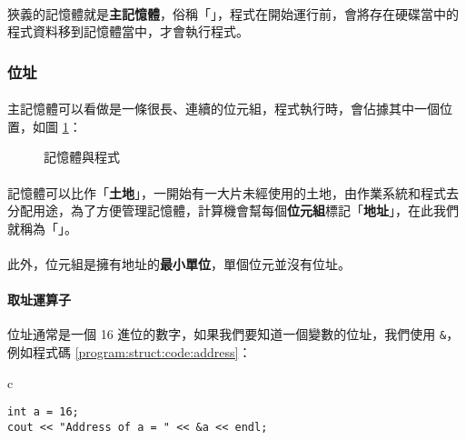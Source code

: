 \documentclass[12pt,a4paper,oneside]{article}
\begin{document}
\begin{CJK}{UTF8}{bkai}
\paragraph{}狹義的記憶體就是\textbf{主記憶體}，俗稱「」，程式在開始運行前，會將存在硬碟當中的程式資料移到記憶體當中，才會執行程式。

\subsubsection{位址}

\paragraph{}主記憶體可以看做是一條很長、連續的位元組，程式執行時，會佔據其中一個位置，如圖 \ref{program:struct:fig:memory:and:program}：

\begin{figure}[h!]
\centering
{}
\caption{記憶體與程式}
\label{program:struct:fig:memory:and:program}
\end{figure}

\paragraph{}記憶體可以比作「\textbf{土地}」，一開始有一大片未經使用的土地，由作業系統和程式去分配用途，為了方便管理記憶體，計算機會幫每個{\color{blue}\textbf{位元組}}標記「\textbf{地址}」，在此我們就稱為「」。
\paragraph{}此外，位元組是擁有地址的{\color{blue}\textbf{最小單位}}，單個位元並沒有位址。

\paragraph{取址運算子}位址通常是一個 16 進位的數字，如果我們要知道一個變數的位址，我們使用 \lstinline!&!，例如程式碼 \ref{program:struct:code:address}：

\begin{code}[h!]
\centering
\begin{tabular}{c}
\begin{lstlisting}
int a = 16;
cout << "Address of a = " << &a << endl;
\end{lstlisting}
\end{tabular}
\caption{印出 \lstinline!a! 的位址}
\label{program:struct:code:address}
\end{code}


\end{CJK}
\end{document}
